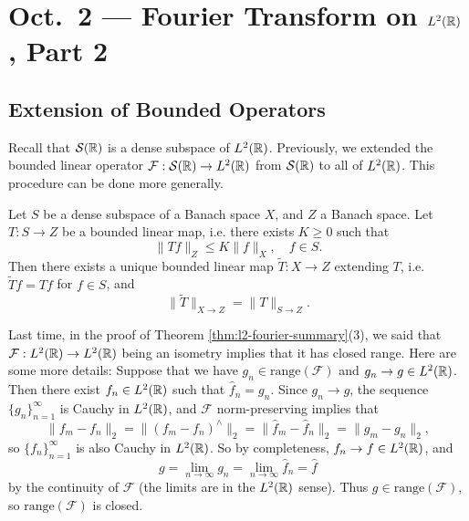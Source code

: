 \chapter{Oct.~2 --- Fourier Transform on \texorpdfstring{$L^2(\mathbb{R})$}{L2(R)}, Part 2}

\section{Extension of Bounded Operators}

\begin{remark}
  Recall that $\mathcal{S}(\mathbb{R})$ is a dense subspace
  of $L^2(\mathbb{R})$.
  Previously, we extended the
  bounded linear operator
  $\mathcal{F} : \mathcal{S}(\mathbb{R}) \to L^2(\mathbb{R})$
  from $\mathcal{S}(\mathbb{R})$ to all of $L^2(\mathbb{R})$.
  This procedure can be done more generally.
\end{remark}

\begin{theorem}
  Let $S$ be a dense subspace of a Banach space
  $X$, and $Z$ a Banach space.
  Let $T : S \to Z$ be a bounded linear map, i.e.
  there exists $K \ge 0$ such that
  \[
    \|Tf\|_Z \le K\|f\|_X, \quad f \in S.
  \]
  Then there exists a unique bounded linear map
  $\widetilde{T} : X \to Z$ extending $T$,
  i.e. $\widetilde{T} f = Tf$ for $f \in S$, and
  \[
    \|\widetilde{T}\|_{X \to Z} = \|T\|_{S \to Z}.
  \]
\end{theorem}

\begin{remark}
  Last time, in the proof of Theorem \ref{thm:l2-fourier-summary}(3),
  we said that $\mathcal{F} : L^2(\mathbb{R}) \to L^2(\mathbb{R})$
  being an isometry implies that it has closed range.
  Here are some more details: Suppose that we have
  $g_n \in \mathrm{range}(\mathcal{F})$ and
  $g_n \to g \in L^2(\mathbb{R})$. Then there exist
  $f_n \in L^2(\mathbb{R})$ such that $\widehat{f}_n = g_n$.
  Since $g_n \to g$, the sequence $\{g_n\}_{n = 1}^\infty$
  is Cauchy in $L^2(\mathbb{R})$, and $\mathcal{F}$
  norm-preserving implies that
  \[
    \|f_m - f_n\|_2
    = \|(f_m - f_n)^\wedge\|_2
    = \|\widehat{f}_m - \widehat{f}_n\|_2
    = \|g_m - g_n\|_2,
  \]
  so $\{f_n\}_{n = 1}^\infty$ is also Cauchy in
  $L^2(\mathbb{R})$. So by completeness,
  $f_n \to f \in L^2(\mathbb{R})$, and
  \[
    g
    = \lim_{n \to \infty} g_n
    = \lim_{n \to \infty} \widehat{f}_n
    = \widehat{f}
  \]
  by the continuity of $\mathcal{F}$
  (the limits are in the $L^2(\mathbb{R})$ sense).
  Thus $g \in \mathrm{range}(\mathcal{F})$, so
  $\mathrm{range}(\mathcal{F})$ is closed.
\end{remark}

